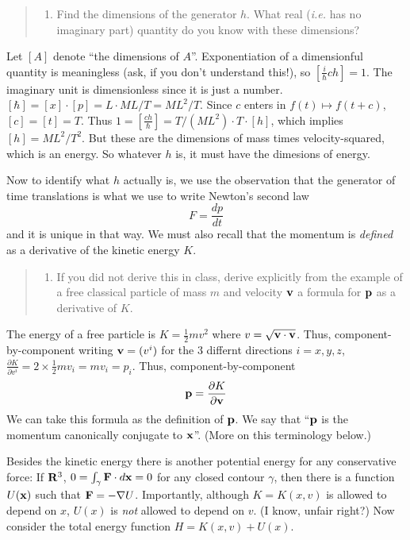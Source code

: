 \documentclass[
  letterpaper,
  DIV=11,
  numbers=noendperiod]{scrartcl}
\providecommand{\tightlist}{%
  \setlength{\itemsep}{0pt}\setlength{\parskip}{0pt}}
\begin{document}
\begin{quote}
\begin{enumerate}
\def\labelenumi{\arabic{enumi}.}
\tightlist
\item
  Find the dimensions of the generator \(h\). What real (\emph{i.e.} has
  no imaginary part) quantity do you know with these dimensions?
\end{enumerate}
\end{quote}

Let \([A]\) denote ``the dimensions of \(A\)''. Exponentiation of a
dimensionful quantity is meaningless (ask, if you don't understand
this!), so \([\frac i\hbar ch]=1\). The imaginary unit is dimensionless
since it is just a number.
\([\hbar]=[x]\cdot [p]= L \cdot ML/T=ML^2/T\). Since \(c\) enters in
\(f(t)\mapsto f(t+c)\), \([c]=[t]=T\). Thus
\(1=[\frac {ch}\hbar ]=T/(ML^2) \cdot T \cdot [h]\), which implies
\([h]=ML^2/T^2\). But these are the dimensions of mass times
velocity-squared, which is an energy. So whatever \(h\) is, it must have
the dimesions of energy.

Now to identify what \(h\) actually is, we use the observation that the
generator of time translations is what we use to write Newton's second
law \[
F=\frac {dp}{dt}
\] and it is unique in that way. We must also recall that the momentum
is \emph{defined} as a derivative of the kinetic energy \(K\).

\begin{quote}
\begin{enumerate}
\def\labelenumi{\arabic{enumi}.}
\setcounter{enumi}{1}
\tightlist
\item
  If you did not derive this in class, derive explicitly from the
  example of a free classical particle of mass \(m\) and velocity
  \(\bf v\) a formula for \(\bf p\) as a derivative of \(K\).
\end{enumerate}
\end{quote}

The energy of a free particle is \(K=\frac12 m v^2\) where
\(v=\sqrt{{\bf v} \cdot {\bf v}}\). Thus, component-by-component writing
\({\bf v}=(v^i)\) for the 3 differnt directions \(i=x,y,z\),
\(\frac{\partial K}{\partial v^i}=2\times \frac12 m v_i= mv_i=p_i\).
Thus, component-by-component \[
{\bf p} = \frac{\partial K}{\partial {\bf v}}
\] We can take this formula as the definition of \({\bf p}\). We say
that ``\({\bf p}\) is the momentum canonically conjugate to
\({\bf x}\)''. (More on this terminology below.)

Besides the kinetic energy there is another potential energy for any
conservative force: If \({\bf R}^3\),
\(0=\int_\gamma {\bf F}\cdot d{\bf x}=0\) for any closed contour
\(\gamma\), then there is a function \(U({\bf x})\) such that
\({\bf F}=-{\nabla}U\). Importantly, although \(K=K(x,v)\) is allowed to
depend on \(x\), \(U(x)\) is \emph{not} allowed to depend on \(v\). (I
know, unfair right?) Now consider the total energy function
\(H=K(x,v)+U(x)\).
\end{document}
